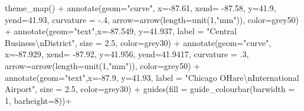 \documentclass[
]{report}
\newenvironment{Shaded}{}{}
\newcommand{\AttributeTok}[1]{\textcolor[rgb]{0.65,0.15,0.64}{#1}}
\newcommand{\DecValTok}[1]{\textcolor[rgb]{0.60,0.41,0.00}{#1}}
\newcommand{\FloatTok}[1]{\textcolor[rgb]{0.60,0.41,0.00}{#1}}
\newcommand{\FunctionTok}[1]{\textcolor[rgb]{0.25,0.47,0.95}{#1}}
\newcommand{\NormalTok}[1]{\textcolor[rgb]{0.22,0.23,0.26}{#1}}
\newcommand{\SpecialCharTok}[1]{\textcolor[rgb]{0.00,0.52,0.74}{#1}}
\newcommand{\StringTok}[1]{\textcolor[rgb]{0.31,0.63,0.31}{#1}}
\begin{document}
\begin{Shaded}
\begin{Highlighting}[]
  \FunctionTok{theme\_map}\NormalTok{() }\SpecialCharTok{+}
  \FunctionTok{annotate}\NormalTok{(}\AttributeTok{geom=}\StringTok{"curve"}\NormalTok{, }\AttributeTok{x=}\SpecialCharTok{{-}}\FloatTok{87.61}\NormalTok{, }\AttributeTok{xend=} \SpecialCharTok{{-}}\FloatTok{87.58}\NormalTok{, }\AttributeTok{y=}\FloatTok{41.9}\NormalTok{, }\AttributeTok{yend=}\FloatTok{41.93}\NormalTok{,}
           \AttributeTok{curvature =} \SpecialCharTok{{-}}\NormalTok{.}\DecValTok{4}\NormalTok{, }\AttributeTok{arrow=}\FunctionTok{arrow}\NormalTok{(}\AttributeTok{length=}\FunctionTok{unit}\NormalTok{(}\DecValTok{1}\NormalTok{,}\StringTok{"mm"}\NormalTok{)), }\AttributeTok{color=}\StringTok{\textquotesingle{}grey50\textquotesingle{}}\NormalTok{) }\SpecialCharTok{+}
  \FunctionTok{annotate}\NormalTok{(}\AttributeTok{geom=}\StringTok{"text"}\NormalTok{,}\AttributeTok{x=}\SpecialCharTok{{-}}\FloatTok{87.549}\NormalTok{, }\AttributeTok{y=}\FloatTok{41.937}\NormalTok{, }\AttributeTok{label =} \StringTok{"Central Business}\SpecialCharTok{\textbackslash{}n}\StringTok{District"}\NormalTok{,}
           \AttributeTok{size =} \FloatTok{2.5}\NormalTok{, }\AttributeTok{color=}\StringTok{\textquotesingle{}grey30\textquotesingle{}}\NormalTok{) }\SpecialCharTok{+}
  \FunctionTok{annotate}\NormalTok{(}\AttributeTok{geom=}\StringTok{"curve"}\NormalTok{, }\AttributeTok{x=}\SpecialCharTok{{-}}\FloatTok{87.929}\NormalTok{, }\AttributeTok{xend=} \SpecialCharTok{{-}}\FloatTok{87.92}\NormalTok{, }\AttributeTok{y=}\FloatTok{41.956}\NormalTok{, }\AttributeTok{yend=}\FloatTok{41.9417}\NormalTok{,}
           \AttributeTok{curvature =}\NormalTok{ .}\DecValTok{3}\NormalTok{, }\AttributeTok{arrow=}\FunctionTok{arrow}\NormalTok{(}\AttributeTok{length=}\FunctionTok{unit}\NormalTok{(}\DecValTok{1}\NormalTok{,}\StringTok{"mm"}\NormalTok{)), }\AttributeTok{color=}\StringTok{\textquotesingle{}grey50\textquotesingle{}}\NormalTok{) }\SpecialCharTok{+}
  \FunctionTok{annotate}\NormalTok{(}\AttributeTok{geom=}\StringTok{"text"}\NormalTok{,}\AttributeTok{x=}\SpecialCharTok{{-}}\FloatTok{87.9}\NormalTok{, }\AttributeTok{y=}\FloatTok{41.93}\NormalTok{, }\AttributeTok{label =} \StringTok{"Chicago O\textquotesingle{}Hare}\SpecialCharTok{\textbackslash{}n}\StringTok{International Airport"}\NormalTok{,}
           \AttributeTok{size =} \FloatTok{2.5}\NormalTok{, }\AttributeTok{color=}\StringTok{\textquotesingle{}grey30\textquotesingle{}}\NormalTok{) }\SpecialCharTok{+}
  \FunctionTok{guides}\NormalTok{(}\AttributeTok{fill =} \FunctionTok{guide\_colourbar}\NormalTok{(}\AttributeTok{barwidth =} \DecValTok{1}\NormalTok{, }\AttributeTok{barheight=}\DecValTok{8}\NormalTok{))}\SpecialCharTok{+}

\end{Highlighting}
\end{Shaded}
\end{document}
